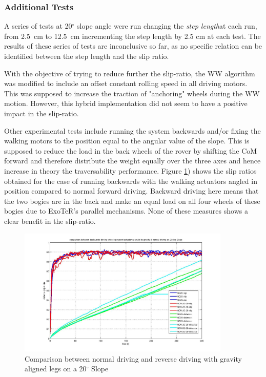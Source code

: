 \documentclass[a4paper,twocolumn]{esapub2005} %
\begin{document}
\subsubsection*{Additional Tests}
A series of tests at 20$^{\circ}$ slope angle were run changing the \textit{step length}\footnotemark[3]
at each run, from 2.5~\unit{cm} to 12.5~\unit{cm} incrementing the step length by 2.5 cm at
each test. The results of these series of tests are inconclusive so far, as no
specific relation can be identified between the step length and the slip ratio.

With the objective of trying to reduce further the slip-ratio, the WW algorithm was modified to include an offset constant rolling speed in all driving motors. This was supposed to increase the traction of "anchoring" wheels during the WW motion. However, this hybrid implementation did not seem to have a positive impact in the slip-ratio.

Other experimental tests include running the system backwards and/or fixing the
walking motors to the position equal to the angular value of the slope. This is
supposed to reduce the load in the back wheels of the rover by shifting the CoM
forward and therefore distribute the weight equally over the three axes and
hence increase in theory the traversability performance. Figure
\ref{fig:ndr20d}) shows the slip ratios obtained for the case of running
backwards with the walking actuators angled in position compared to normal
forward driving. Backward driving here means that the two bogies are in the
back and make an equal load on all four wheels of these bogies due to ExoTeR's
parallel mechanisms. None of these measures shows a clear benefit in the slip-ratio.

\begin{figure}[h!]
    \centering
    \includegraphics[width=0.9\textwidth]{ndr20d.jpg}	\caption{Comparison between
    normal driving and reverse driving with gravity aligned legs on a 20$^{\circ}$ Slope}
    \label{fig:ndr20d}
\end{figure}
\end{document}
